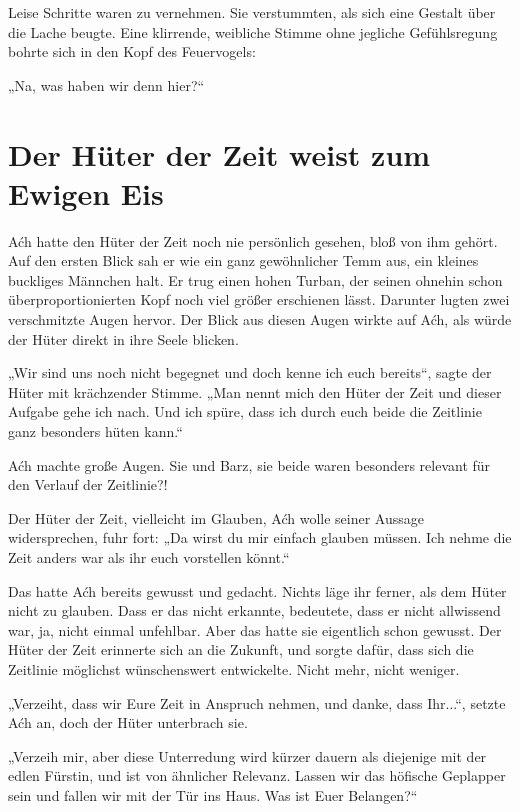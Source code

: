 Leise Schritte waren zu vernehmen. Sie verstummten, als sich eine Gestalt über die Lache beugte. Eine klirrende, weibliche Stimme ohne jegliche Gefühlsregung bohrte sich in den Kopf des Feuervogels:

„Na, was haben wir denn hier?“









\newpage
\section{Der Hüter der Zeit weist zum Ewigen Eis}

Aćh hatte den Hüter der Zeit noch nie persönlich gesehen, bloß von ihm gehört. Auf den ersten Blick sah er wie ein ganz gewöhnlicher Temm aus, ein kleines buckliges Männchen halt. Er trug einen hohen Turban, der seinen ohnehin schon überproportionierten Kopf noch viel größer erschienen lässt. Darunter lugten zwei verschmitzte Augen hervor. Der Blick aus diesen Augen wirkte auf Aćh, als würde der Hüter direkt in ihre Seele blicken.

„Wir sind uns noch nicht begegnet und doch kenne ich euch bereits“, sagte der Hüter mit krächzender Stimme. „Man nennt mich den Hüter der Zeit und dieser Aufgabe gehe ich nach. Und ich spüre, dass ich durch euch beide die Zeitlinie ganz besonders hüten kann.“

Aćh machte große Augen. Sie und Barz, sie beide waren besonders relevant für den Verlauf der Zeitlinie?!

Der Hüter der Zeit, vielleicht im Glauben, Aćh wolle seiner Aussage widersprechen, fuhr fort: „Da wirst du mir einfach glauben müssen. Ich nehme die Zeit anders war als ihr euch vorstellen könnt.“

Das hatte Aćh bereits gewusst und gedacht. Nichts läge ihr ferner, als dem Hüter nicht zu glauben. Dass er das nicht erkannte, bedeutete, dass er nicht allwissend war, ja, nicht einmal unfehlbar. Aber das hatte sie eigentlich schon gewusst. Der Hüter der Zeit erinnerte sich an die Zukunft, und sorgte dafür, dass sich die Zeitlinie möglichst wünschenswert entwickelte. Nicht mehr, nicht weniger.

„Verzeiht, dass wir Eure Zeit in Anspruch nehmen, und danke, dass Ihr...“, setzte Aćh an, doch der Hüter unterbrach sie.

„Verzeih mir, aber diese Unterredung wird kürzer dauern als diejenige mit der edlen Fürstin, und ist von ähnlicher Relevanz. Lassen wir das höfische Geplapper sein und fallen wir mit der Tür ins Haus. Was ist Euer Belangen?“


